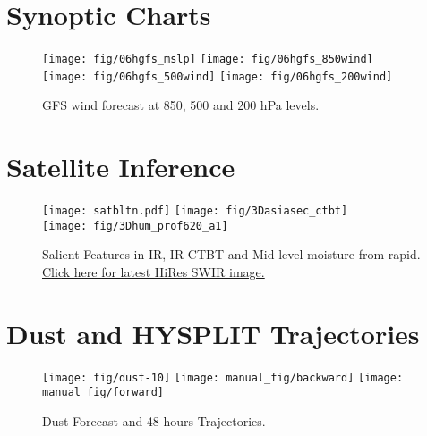 \documentclass[12pt,a4paper]{article} %
\begin{document}
\section{Synoptic Charts}
\begin{figure}[H]
\centering
\texttt{[image: fig/06hgfs\_mslp]}
\texttt{[image: fig/06hgfs\_850wind]}\\
\texttt{[image: fig/06hgfs\_500wind]}
\texttt{[image: fig/06hgfs\_200wind]}
\caption{GFS wind forecast at 850, 500 and 200 hPa levels.}
\end{figure}





\section{Satellite Inference}
\begin{figure}[H]
\centering
\texttt{[image: satbltn.pdf]}
\texttt{[image: fig/3Dasiasec\_ctbt]}\\
\texttt{[image: fig/3Dhum\_prof620\_a1]}
\caption{Salient Features in IR, IR CTBT and Mid-level moisture from rapid. \href{http://satellite.imd.gov.in/img/3Dswsec_swir.jpg}{Click here for latest HiRes SWIR image.}}
\end{figure}






\section{Dust and HYSPLIT Trajectories}

\begin{figure}[H]
\centering
\texttt{[image: fig/dust-10]}
\texttt{[image: manual\_fig/backward]}
\texttt{[image: manual\_fig/forward]}
\caption{Dust Forecast and 48 hours Trajectories.}
\end{figure}
\end{document}
